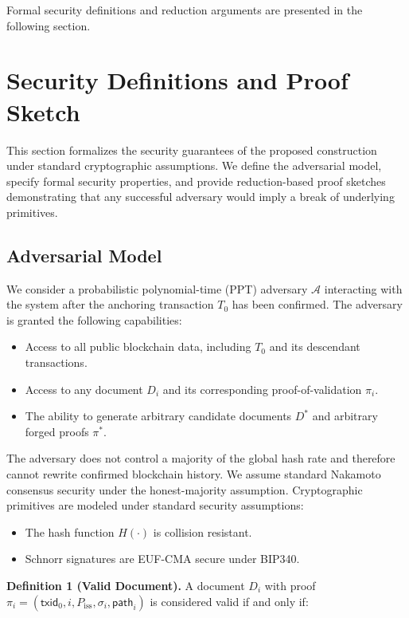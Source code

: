 \documentclass{IEEEoj}
\begin{document}
Formal security definitions and reduction arguments are presented in the following section.
\section{Security Definitions and Proof Sketch}
\label{sec:security}

This section formalizes the security guarantees of the proposed construction under standard cryptographic assumptions. We define the adversarial model, specify formal security properties, and provide reduction-based proof sketches demonstrating that any successful adversary would imply a break of underlying primitives.

\subsection{Adversarial Model}

We consider a probabilistic polynomial-time (PPT) adversary $\mathcal{A}$ interacting with the system after the anchoring transaction $T_0$ has been confirmed. The adversary is granted the following capabilities:

\begin{itemize}
    \item Access to all public blockchain data, including $T_0$ and its descendant transactions.
    \item Access to any document $D_i$ and its corresponding proof-of-validation $\pi_i$.
    \item The ability to generate arbitrary candidate documents $D^*$ and arbitrary forged proofs $\pi^*$.
\end{itemize}

The adversary does not control a majority of the global hash rate and therefore cannot rewrite confirmed blockchain history. We assume standard Nakamoto consensus security under the honest-majority assumption. Cryptographic primitives are modeled under standard security assumptions:

\begin{itemize}
    \item The hash function $H(\cdot)$ is collision resistant.
    \item Schnorr signatures are EUF-CMA secure under BIP340.
\end{itemize}

\textbf{Definition 1 (Valid Document).}  
A document $D_i$ with proof $\pi_i = (\mathsf{txid}_0, i, P_{\mathrm{iss}}, \sigma_i, \mathsf{path}_i)$ is considered valid if and only if:
\end{document}
